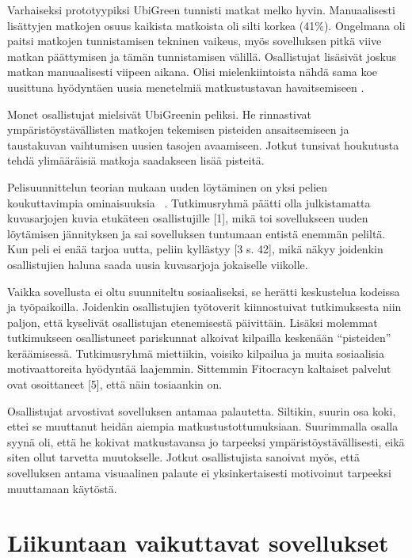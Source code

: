 \documentclass[finnish]{tktltiki2}
\theoremstyle{definition}
\theoremstyle{remark}
\begin{document}
Varhaiseksi prototyypiksi UbiGreen tunnisti matkat melko hyvin. Manuaalisesti lisättyjen matkojen osuus kaikista matkoista oli silti korkea (41\%).
Ongelmana oli paitsi matkojen tunnistamisen tekninen vaikeus, myös sovelluksen pitkä viive matkan päättymisen ja tämän tunnistamisen välillä.
Osallistujat lisäsivät joskus matkan manuaalisesti viipeen aikana.
Olisi mielenkiintoista nähdä sama koe uusittuna hyödyntäen uusia menetelmiä matkustustavan havaitsemiseen \cite{hemminki}.

Monet osallistujat mielsivät UbiGreenin peliksi. He rinnastivat ympäristöystävällisten matkojen tekemisen pisteiden ansaitsemiseen ja taustakuvan vaihtumisen uusien tasojen avaamiseen. Jotkut tunsivat houkutusta tehdä ylimääräisiä matkoja saadakseen lisää pisteitä. 

Pelisuunnittelun teorian mukaan uuden löytäminen on yksi pelien koukuttavimpia ominaisuuksia \cite[s.~90]{theoryoffun}~\cite[s.~109]{gamedesign}. Tutkimusryhmä päätti olla julkistamatta kuvasarjojen kuvia etukäteen osallistujille [1], mikä toi sovellukseen uuden löytämisen jännityksen ja sai sovelluksen tuntumaan entistä enemmän peliltä. Kun peli ei enää tarjoa uutta, peliin kyllästyy [3 s. 42], mikä näkyy joidenkin osallistujien haluna saada uusia kuvasarjoja jokaiselle viikolle.

Vaikka sovellusta ei oltu suunniteltu sosiaaliseksi, se herätti keskustelua kodeissa ja työpaikoilla. Joidenkin osallistujien työtoverit kiinnostuivat tutkimuksesta niin paljon, että kyselivät osallistujan etenemisestä päivittäin. Lisäksi molemmat tutkimukseen osallistuneet pariskunnat alkoivat kilpailla keskenään “pisteiden” keräämisessä. Tutkimusryhmä miettiikin, voisiko kilpailua ja muita sosiaalisia motivaattoreita hyödyntää laajemmin. Sittemmin Fitocracyn kaltaiset palvelut ovat osoittaneet [5], että näin tosiaankin on.

Osallistujat arvostivat sovelluksen antamaa palautetta. Siltikin, suurin osa koki, ettei se muuttanut heidän aiempia matkustustottumuksiaan. Suurimmalla osalla syynä oli, että he kokivat matkustavansa jo tarpeeksi ympäristöystävällisesti, eikä siten ollut tarvetta muutokselle. Jotkut osallistujista sanoivat myös, että sovelluksen antama visuaalinen palaute ei yksinkertaisesti motivoinut tarpeeksi muuttamaan käytöstä.

\section{Liikuntaan vaikuttavat sovellukset}
\end{document}
